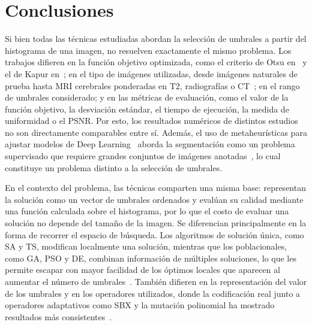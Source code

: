 \documentclass[letter, 10pt]{article}
\begin{document}
\section{Conclusiones}
Si bien todas las t\'ecnicas estudiadas abordan la selecci\'on de umbrales a partir del histograma de una imagen, no resuelven exactamente el mismo problema.
Los trabajos difieren en la funci\'on objetivo optimizada, como el criterio de Otsu en~\cite{Hammouche2010Comparative} y el de Kapur en~\cite{Manikandan2014Multilevel};
en el tipo de im\'agenes utilizadas, desde im\'agenes naturales de prueba hasta MRI cerebrales ponderadas en T2, radiograf\'ias o CT~\cite{Lameesa2024Role};
en el rango de umbrales considerado; y en las m\'etricas de evaluaci\'on, como el valor de la funci\'on objetivo, la desviaci\'on est\'andar, el tiempo de ejecuci\'on, la medida de uniformidad o el PSNR.
Por esto, los resultados num\'ericos de distintos estudios no son directamente comparables entre s\'i.
Adem\'as, el uso de metaheur\'isticas para ajustar modelos de Deep Learning~\cite{Lameesa2024Role} aborda la segmentaci\'on como un problema supervisado que requiere grandes conjuntos de im\'agenes anotadas~\cite{Fateh2026BRISC},
lo cual constituye un problema distinto a la selecci\'on de umbrales.

En el contexto del problema, las t\'ecnicas comparten una misma base: representan la soluci\'on como un vector de umbrales ordenados y eval\'uan su calidad mediante una funci\'on calculada sobre el histograma, por lo que el costo de evaluar una soluci\'on no depende del tama\~no de la imagen.
Se diferencian principalmente en la forma de recorrer el espacio de b\'usqueda.
Los algoritmos de soluci\'on \'unica, como SA y TS, modifican localmente una soluci\'on, mientras que los poblacionales, como GA, PSO y DE, combinan informaci\'on de m\'ultiples soluciones, lo que les permite escapar con mayor facilidad de los \'optimos locales que aparecen al aumentar el n\'umero de umbrales~\cite{Hammouche2010Comparative}.
Tambi\'en difieren en la representaci\'on del valor de los umbrales y en los operadores utilizados, donde la codificaci\'on real junto a operadores adaptativos como SBX y la mutaci\'on polinomial ha mostrado resultados m\'as consistentes~\cite{Manikandan2014Multilevel}.
\end{document}
